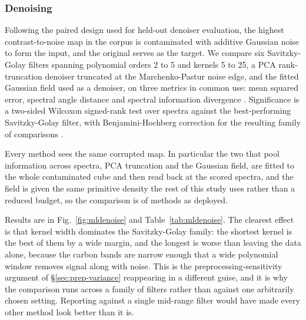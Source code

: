 \subsubsection{Denoising}

Following the paired design used for held-out denoiser evaluation, the
highest contrast-to-noise map in the corpus is contaminated with additive
Gaussian noise to form the input, and the original serves as the target. We
compare six Savitzky-Golay filters \cite{savitzky1964smoothing} spanning
polynomial orders 2 to 5 and kernels 5 to 25, a PCA rank-truncation denoiser
truncated at the Marchenko-Pastur noise edge, and the fitted Gaussian field
used as a denoiser, on three metrics in common use: mean squared error,
spectral angle distance \cite{kruse1993spectral} and spectral information
divergence \cite{chang1999spectral}. Significance is a two-sided Wilcoxon
signed-rank test over spectra against the best-performing Savitzky-Golay
filter, with Benjamini-Hochberg correction for the resulting family of
comparisons \cite{benjamini1995controlling}.

Every method sees the same corrupted map. In particular the two that pool
information across spectra, PCA truncation and the Gaussian field, are fitted
to the whole contaminated cube and then read back at the scored spectra, and
the field is given the same primitive density the rest of this study uses
rather than a reduced budget, so the comparison is of methods as deployed.

Results are in Fig.~\ref{fig:mldenoise} and Table~\ref{tab:mldenoise}. The
clearest effect is that kernel width dominates the Savitzky-Golay family: the
shortest kernel is the best of them by a wide margin, and the longest is worse
than leaving the data alone, because the carbon bands are narrow enough that a
wide polynomial window removes signal along with noise. This is the
preprocessing-sensitivity argument of \S\ref{sec:prep-variance} reappearing in
a different guise, and it is why the comparison runs across a family of filters
rather than against one arbitrarily chosen setting. Reporting against a single
mid-range filter would have made every other method look better than it is.

